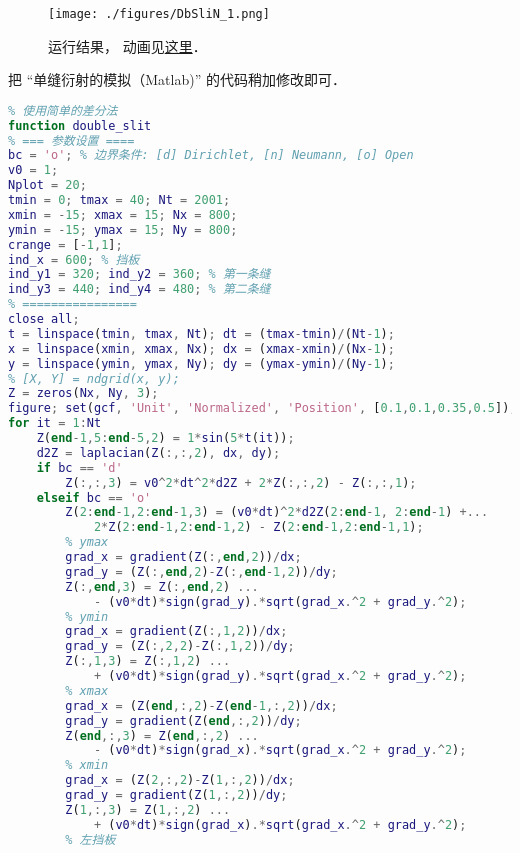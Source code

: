 
\begin{issues}
\issueDraft
\end{issues}


\begin{figure}[ht]
\centering
\texttt{[image: ./figures/DbSliN\_1.png]}
\caption{运行结果， 动画见\href{https://wuli.wiki/apps/db_slit.html}{这里}．} \label{DbSliN_fig1}
\end{figure}

把 “单缝衍射的模拟（Matlab)” 的代码稍加修改即可．
\begin{lstlisting}[language=matlab, caption=double\_slit.m]
% 双缝干涉的模拟
% 使用简单的差分法
function double_slit
% === 参数设置 ====
bc = 'o'; % 边界条件: [d] Dirichlet, [n] Neumann, [o] Open
v0 = 1;
Nplot = 20;
tmin = 0; tmax = 40; Nt = 2001;
xmin = -15; xmax = 15; Nx = 800;
ymin = -15; ymax = 15; Ny = 800;
crange = [-1,1];
ind_x = 600; % 挡板
ind_y1 = 320; ind_y2 = 360; % 第一条缝
ind_y3 = 440; ind_y4 = 480; % 第二条缝
% ================
close all;
t = linspace(tmin, tmax, Nt); dt = (tmax-tmin)/(Nt-1);
x = linspace(xmin, xmax, Nx); dx = (xmax-xmin)/(Nx-1);
y = linspace(ymin, ymax, Ny); dy = (ymax-ymin)/(Ny-1);
% [X, Y] = ndgrid(x, y);
Z = zeros(Nx, Ny, 3);
figure; set(gcf, 'Unit', 'Normalized', 'Position', [0.1,0.1,0.35,0.5]);
for it = 1:Nt
    Z(end-1,5:end-5,2) = 1*sin(5*t(it));
    d2Z = laplacian(Z(:,:,2), dx, dy);
    if bc == 'd'
        Z(:,:,3) = v0^2*dt^2*d2Z + 2*Z(:,:,2) - Z(:,:,1);
    elseif bc == 'o'
        Z(2:end-1,2:end-1,3) = (v0*dt)^2*d2Z(2:end-1, 2:end-1) +...
            2*Z(2:end-1,2:end-1,2) - Z(2:end-1,2:end-1,1);
        % ymax
        grad_x = gradient(Z(:,end,2))/dx;
        grad_y = (Z(:,end,2)-Z(:,end-1,2))/dy;
        Z(:,end,3) = Z(:,end,2) ...
            - (v0*dt)*sign(grad_y).*sqrt(grad_x.^2 + grad_y.^2);
        % ymin
        grad_x = gradient(Z(:,1,2))/dx;
        grad_y = (Z(:,2,2)-Z(:,1,2))/dy;
        Z(:,1,3) = Z(:,1,2) ...
            + (v0*dt)*sign(grad_y).*sqrt(grad_x.^2 + grad_y.^2);
        % xmax
        grad_x = (Z(end,:,2)-Z(end-1,:,2))/dx;
        grad_y = gradient(Z(end,:,2))/dy;
        Z(end,:,3) = Z(end,:,2) ...
            - (v0*dt)*sign(grad_x).*sqrt(grad_x.^2 + grad_y.^2);
        % xmin
        grad_x = (Z(2,:,2)-Z(1,:,2))/dx;
        grad_y = gradient(Z(1,:,2))/dy;
        Z(1,:,3) = Z(1,:,2) ...
            + (v0*dt)*sign(grad_x).*sqrt(grad_x.^2 + grad_y.^2);
        % 左挡板

\end{lstlisting}
